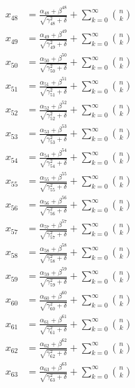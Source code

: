 \documentclass{article}
\begin{document}
\begin{align}
  x_{48} &= \frac{\alpha_{48} + \beta^{48}}{\sqrt{\gamma_{48}^2 + \delta}} + \sum_{k=0}^{\infty} \binom{n}{k} \label{eq:48} \\
  x_{49} &= \frac{\alpha_{49} + \beta^{49}}{\sqrt{\gamma_{49}^2 + \delta}} + \sum_{k=0}^{\infty} \binom{n}{k} \label{eq:49} \\
  x_{50} &= \frac{\alpha_{50} + \beta^{50}}{\sqrt{\gamma_{50}^2 + \delta}} + \sum_{k=0}^{\infty} \binom{n}{k} \label{eq:50} \\
  x_{51} &= \frac{\alpha_{51} + \beta^{51}}{\sqrt{\gamma_{51}^2 + \delta}} + \sum_{k=0}^{\infty} \binom{n}{k} \label{eq:51} \\
  x_{52} &= \frac{\alpha_{52} + \beta^{52}}{\sqrt{\gamma_{52}^2 + \delta}} + \sum_{k=0}^{\infty} \binom{n}{k} \label{eq:52} \\
  x_{53} &= \frac{\alpha_{53} + \beta^{53}}{\sqrt{\gamma_{53}^2 + \delta}} + \sum_{k=0}^{\infty} \binom{n}{k} \label{eq:53} \\
  x_{54} &= \frac{\alpha_{54} + \beta^{54}}{\sqrt{\gamma_{54}^2 + \delta}} + \sum_{k=0}^{\infty} \binom{n}{k} \label{eq:54} \\
  x_{55} &= \frac{\alpha_{55} + \beta^{55}}{\sqrt{\gamma_{55}^2 + \delta}} + \sum_{k=0}^{\infty} \binom{n}{k} \label{eq:55} \\
  x_{56} &= \frac{\alpha_{56} + \beta^{56}}{\sqrt{\gamma_{56}^2 + \delta}} + \sum_{k=0}^{\infty} \binom{n}{k} \label{eq:56} \\
  x_{57} &= \frac{\alpha_{57} + \beta^{57}}{\sqrt{\gamma_{57}^2 + \delta}} + \sum_{k=0}^{\infty} \binom{n}{k} \label{eq:57} \\
  x_{58} &= \frac{\alpha_{58} + \beta^{58}}{\sqrt{\gamma_{58}^2 + \delta}} + \sum_{k=0}^{\infty} \binom{n}{k} \label{eq:58} \\
  x_{59} &= \frac{\alpha_{59} + \beta^{59}}{\sqrt{\gamma_{59}^2 + \delta}} + \sum_{k=0}^{\infty} \binom{n}{k} \label{eq:59} \\
  x_{60} &= \frac{\alpha_{60} + \beta^{60}}{\sqrt{\gamma_{60}^2 + \delta}} + \sum_{k=0}^{\infty} \binom{n}{k} \label{eq:60} \\
  x_{61} &= \frac{\alpha_{61} + \beta^{61}}{\sqrt{\gamma_{61}^2 + \delta}} + \sum_{k=0}^{\infty} \binom{n}{k} \label{eq:61} \\
  x_{62} &= \frac{\alpha_{62} + \beta^{62}}{\sqrt{\gamma_{62}^2 + \delta}} + \sum_{k=0}^{\infty} \binom{n}{k} \label{eq:62} \\
  x_{63} &= \frac{\alpha_{63} + \beta^{63}}{\sqrt{\gamma_{63}^2 + \delta}} + \sum_{k=0}^{\infty} \binom{n}{k} \label{eq:63} \\

\end{align}
\end{document}
